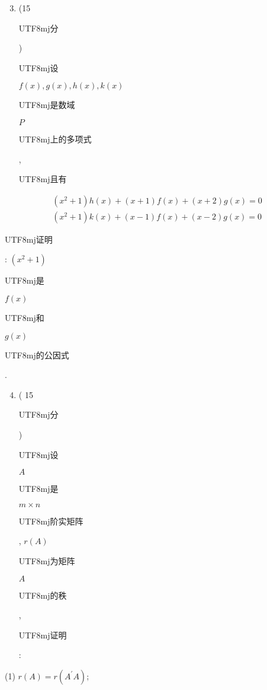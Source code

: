 \documentclass[10pt]{article}
\begin{document}
\begin{enumerate}
  \setcounter{enumi}{2}
  \item (15 \begin{CJK}{UTF8}{mj}分\end{CJK}) \begin{CJK}{UTF8}{mj}设\end{CJK} $f(x), g(x), h(x), k(x)$ \begin{CJK}{UTF8}{mj}是数域\end{CJK} $P$ \begin{CJK}{UTF8}{mj}上的多项式\end{CJK}, \begin{CJK}{UTF8}{mj}且有\end{CJK}
\end{enumerate}
$$
\begin{aligned}
&\left(x^{2}+1\right) h(x)+(x+1) f(x)+(x+2) g(x)=0 \\
&\left(x^{2}+1\right) k(x)+(x-1) f(x)+(x-2) g(x)=0
\end{aligned}
$$
\begin{CJK}{UTF8}{mj}证明\end{CJK}: $\left(x^{2}+1\right)$ \begin{CJK}{UTF8}{mj}是\end{CJK} $f(x)$ \begin{CJK}{UTF8}{mj}和\end{CJK} $g(x)$ \begin{CJK}{UTF8}{mj}的公因式\end{CJK}.

\begin{enumerate}
  \setcounter{enumi}{3}
  \item ( 15 \begin{CJK}{UTF8}{mj}分\end{CJK}) \begin{CJK}{UTF8}{mj}设\end{CJK} $A$ \begin{CJK}{UTF8}{mj}是\end{CJK} $m \times n$ \begin{CJK}{UTF8}{mj}阶实矩阵\end{CJK}, $r(A)$ \begin{CJK}{UTF8}{mj}为矩阵\end{CJK} $A$ \begin{CJK}{UTF8}{mj}的秩\end{CJK}, \begin{CJK}{UTF8}{mj}证明\end{CJK}:
\end{enumerate}
(1) $r(A)=r\left(A^{\prime} A\right)$;
\end{document}
